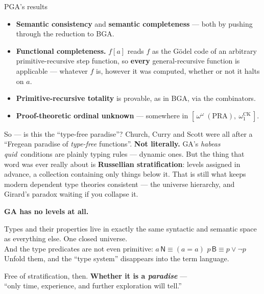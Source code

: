 \documentclass[aspectratio=169,11pt]{beamer}
\newcommand{\hq}{\textit{habeas quid}}
\newcommand{\key}[1]{{\color{accent}\textbf{#1}}}
\newcommand{\amber}[1]{{\color{gap}\textbf{#1}}}
\begin{document}
\begin{frame}{PGA's results}
  \vfill
  \small
  \begin{itemize}\itemsep0.3em
    \item \textbf{Semantic consistency} and \textbf{semantic completeness} --- both
          by pushing through the reduction to BGA.
    \item \textbf{Functional completeness.} $f[a]$ reads $f$ as the G\"odel code of an
          arbitrary primitive-recursive step function, so \key{every} general-recursive
          function is applicable --- whatever $f$ is, however it was computed, whether
          or not it halts on $a$.
    \item \textbf{Primitive-recursive totality} is provable, as in BGA, via the combinators.
    \item \amber{Proof-theoretic ordinal unknown} --- somewhere in
          $[\,\omega^{\omega}\ (\text{PRA}),\ \omega_1^{\mathrm{CK}}\,]$.
  \end{itemize}
\end{frame}

\begin{frame}{So --- is this the ``type-free paradise''?}
  \vfill
  {\small Church, Curry and Scott were all after a ``Fregean paradise of
   \emph{type-free} functions''.}
  \vfill
  \pause
  \key{Not literally.} GA's \hq\ conditions are plainly typing rules --- dynamic ones.
  \vfill
  \pause
  But the thing that word was ever really about is \key{Russellian stratification}:
  levels assigned in advance, a collection containing only things below it. That is
  still what keeps modern dependent type theories consistent --- the universe hierarchy,
  and Girard's paradox waiting if you collapse it.
  \vfill
  \begin{center}\large
    \key{GA has no levels at all.}
  \end{center}
  \begin{center}\small
    Types and their properties live in exactly the same syntactic and semantic space
    as everything else. One closed universe.\\[0.4em]
    And the type predicates are not even primitive:
    \quad $a\,\mathsf{N} \equiv (a = a)$ \qquad $p\,\mathsf{B} \equiv p \vee \neg p$\\[0.3em]
    Unfold them, and the ``type system'' disappears into the term language.
  \end{center}
  \vfill
  \pause
  \begin{center}
    Free of stratification, then. \; \key{Whether it is a \emph{paradise}} ---\\
    {\small ``only time, experience, and further exploration will tell.''}
  \end{center}
\end{frame}
\end{document}
